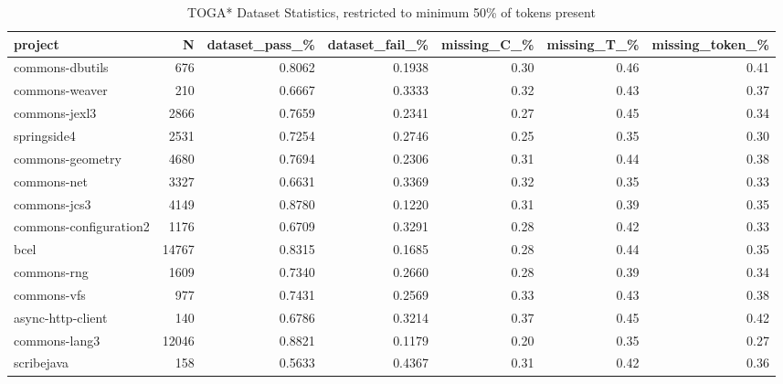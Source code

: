 \begin{table*}
\centering
\caption{TOGA* Dataset Statistics, restricted to minimum 50\% of tokens present}
\label{tab:toga_stats_50}
\begin{tabular}{lrrrrrr}
\toprule
                project &       N &  dataset\_pass\_\% &  dataset\_fail\_\% &  missing\_C\_\% &  missing\_T\_\% &  missing\_token\_\% \\
\midrule
        commons-dbutils &     676 &          0.8062 &          0.1938 &         0.30 &         0.46 &             0.41 \\
         commons-weaver &     210 &          0.6667 &          0.3333 &         0.32 &         0.43 &             0.37 \\
          commons-jexl3 &    2866 &          0.7659 &          0.2341 &         0.27 &         0.45 &             0.34 \\
            springside4 &    2531 &          0.7254 &          0.2746 &         0.25 &         0.35 &             0.30 \\
       commons-geometry &    4680 &          0.7694 &          0.2306 &         0.31 &         0.44 &             0.38 \\
            commons-net &    3327 &          0.6631 &          0.3369 &         0.32 &         0.35 &             0.33 \\
           commons-jcs3 &    4149 &          0.8780 &          0.1220 &         0.31 &         0.39 &             0.35 \\
 commons-configuration2 &    1176 &          0.6709 &          0.3291 &         0.28 &         0.42 &             0.33 \\
                   bcel &   14767 &          0.8315 &          0.1685 &         0.28 &         0.44 &             0.35 \\
            commons-rng &    1609 &          0.7340 &          0.2660 &         0.28 &         0.39 &             0.34 \\
            commons-vfs &     977 &          0.7431 &          0.2569 &         0.33 &         0.43 &             0.38 \\
      async-http-client &     140 &          0.6786 &          0.3214 &         0.37 &         0.45 &             0.42 \\
          commons-lang3 &   12046 &          0.8821 &          0.1179 &         0.20 &         0.35 &             0.27 \\
             scribejava &     158 &          0.5633 &          0.4367 &         0.31 &         0.42 &             0.36 \\

\end{tabular}
\end{table*}
